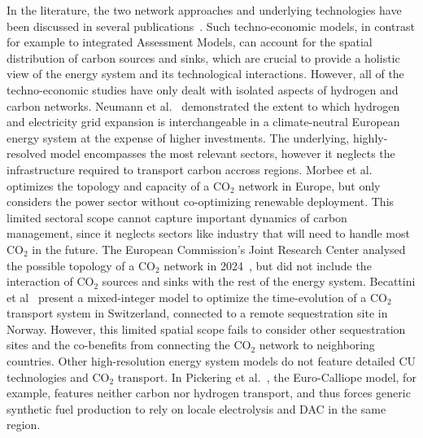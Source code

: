 \documentclass[twocolumn]{article}
\newcommand{\carbon}{CO$_2$}
\begin{document}
In the literature, the two network approaches and underlying technologies have been discussed in several publications~\cite{bakkenLinearModelsOptimization2008,morbeeOptimisedDeploymentEuropean2012,stewartFeasibilityEuropeanwideIntegrated2014,oeiModelingCarbonCapture2014,elahiMultiperiodLeastCost2014,burandtDecarbonizingChinaEnergy2019,middletonSimCCSOpensourceTool2020,bjerketvedtOptimalDesignCost2020,weiProposedGlobalLayout2021,damoreOptimalDesignEuropean2021,becattiniCarbonDioxideCapture2022,neumannBenefitsHydrogenNetwork2022}. Such techno-economic models, in contrast for example to integrated Assessment Models, can account for the spatial distribution of carbon sources and sinks, which are crucial to provide a holistic view of the energy system and its technological interactions. However, all of the techno-economic studies have only dealt with isolated aspects of hydrogen and carbon networks. Neumann et al.~\cite{neumannBenefitsHydrogenNetwork2022} demonstrated the extent to which hydrogen and electricity grid expansion is interchangeable in a climate-neutral European energy system at the expense of higher investments. The underlying, highly-resolved model encompasses the most relevant sectors, however it neglects the infrastructure required to transport carbon accross regions.
Morbee et al.~\cite{morbeeOptimisedDeploymentEuropean2012} optimizes the topology and capacity of a \carbon{} network in Europe, but only considers the power sector without co-optimizing renewable deployment. This limited sectoral scope cannot capture important dynamics of carbon management, since it neglects sectors like industry that will need to handle most \carbon{} in the future.
The European Commission's Joint Research Center analysed the possible topology of a \carbon{} network in 2024~\cite{jrc2024}, but did not include the interaction of  \carbon{} sources and sinks with the rest of the energy system.
Becattini et al~\cite{becattiniCarbonDioxideCapture2022} present a mixed-integer model to optimize the time-evolution of a \carbon{} transport system in Switzerland, connected to a remote sequestration site in Norway. However, this limited spatial scope fails to consider other sequestration sites and the co-benefits from connecting the \carbon{} network to neighboring countries.
Other high-resolution energy system models do not feature detailed CU technologies and \carbon{} transport. In Pickering et al.~\cite{pickeringDiversityOptionsEliminate2022}, the Euro-Calliope model, for example, features neither carbon nor hydrogen transport, and thus forces generic synthetic fuel production to rely on locale electrolysis and DAC in the same region.
\end{document}
